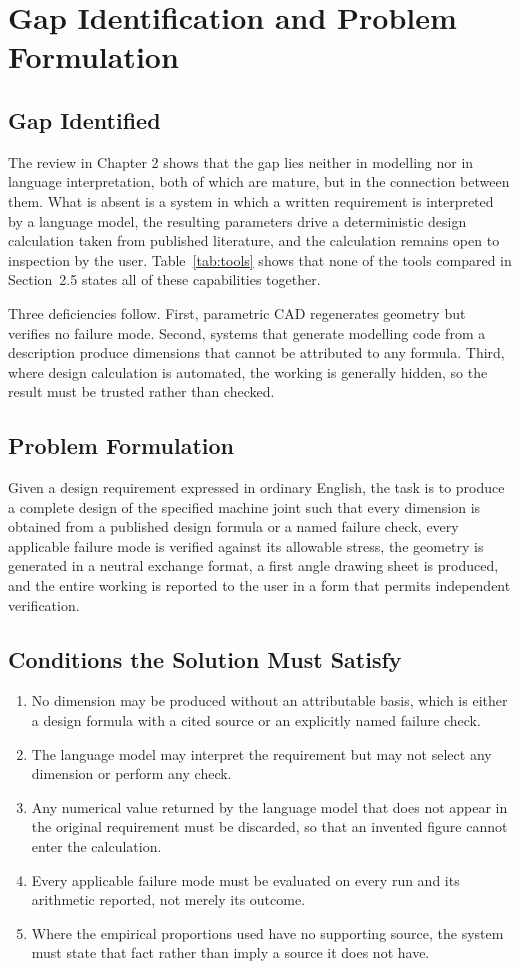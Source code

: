 \chapter{Gap Identification and Problem Formulation}

\section{Gap Identified}
The review in Chapter 2 shows that the gap lies neither in modelling nor in language interpretation, both of which are mature, but in the connection between them. What is absent is a system in which a written requirement is interpreted by a language model, the resulting parameters drive a deterministic design calculation taken from published literature, and the calculation remains open to inspection by the user. Table~\ref{tab:tools} shows that none of the tools compared in Section~2.5 states all of these capabilities together.

Three deficiencies follow. First, parametric CAD regenerates geometry but verifies no failure mode. Second, systems that generate modelling code from a description produce dimensions that cannot be attributed to any formula. Third, where design calculation is automated, the working is generally hidden, so the result must be trusted rather than checked.

\section{Problem Formulation}
Given a design requirement expressed in ordinary English, the task is to produce a complete design of the specified machine joint such that every dimension is obtained from a published design formula or a named failure check, every applicable failure mode is verified against its allowable stress, the geometry is generated in a neutral exchange format, a first angle drawing sheet is produced, and the entire working is reported to the user in a form that permits independent verification.

\section{Conditions the Solution Must Satisfy}
\begin{enumerate}
  \item No dimension may be produced without an attributable basis, which is either a design formula with a cited source or an explicitly named failure check.
  \item The language model may interpret the requirement but may not select any dimension or perform any check.
  \item Any numerical value returned by the language model that does not appear in the original requirement must be discarded, so that an invented figure cannot enter the calculation.
  \item Every applicable failure mode must be evaluated on every run and its arithmetic reported, not merely its outcome.
  \item Where the empirical proportions used have no supporting source, the system must state that fact rather than imply a source it does not have.
\end{enumerate}
